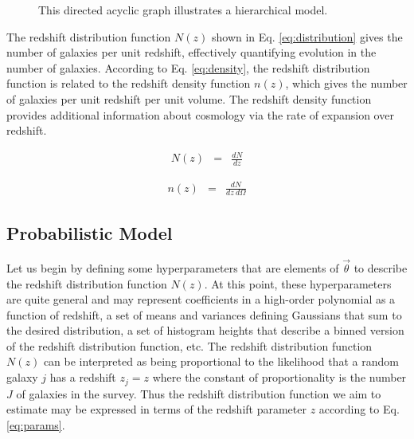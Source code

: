 \documentclass[preprint]{aastex}
\begin{document}
\begin{figure}
\vspace{0.5cm}
\begin{center}
\caption{This directed acyclic graph illustrates a hierarchical model.}
\label{fig:flow}
\end{center}
\end{figure}

The redshift distribution function $N(z)$ shown in Eq. \ref{eq:distribution} gives the number of galaxies per unit redshift, effectively quantifying evolution in the number of galaxies.  \citep{men13}  According to Eq. \ref{eq:density}, the redshift distribution function is related to the redshift density function $n(z)$, which gives the number of galaxies per unit redshift per unit volume.  The redshift density function provides additional information about cosmology via the rate of expansion over redshift.

\begin{eqnarray}
\label{eq:distribution}
N(z) &=& \frac{dN}{dz}
\end{eqnarray}

\begin{eqnarray}
\label{eq:density}
n(z) &=& \frac{dN}{dz\ d\Omega}
\end{eqnarray}

\subsection{Probabilistic Model}
\label{sec:prob}

Let us begin by defining some hyperparameters that are elements of $\vec{\theta}$ to describe the redshift distribution function $N(z)$.  At this point, these hyperparameters are quite general and may represent coefficients in a high-order polynomial as a function of redshift, a set of means and variances defining Gaussians that sum to the desired distribution, a set of histogram heights that describe a binned version of the redshift distribution function, etc.  The redshift distribution function $N(z)$ can be interpreted as being proportional to the likelihood that a random galaxy $j$ has a redshift $z_{j}=z$ where the constant of proportionality is the number $J$ of galaxies in the survey.  Thus the redshift distribution function we aim to estimate may be expressed in terms of the redshift parameter $z$ according to Eq. \ref{eq:params}.
\end{document}
